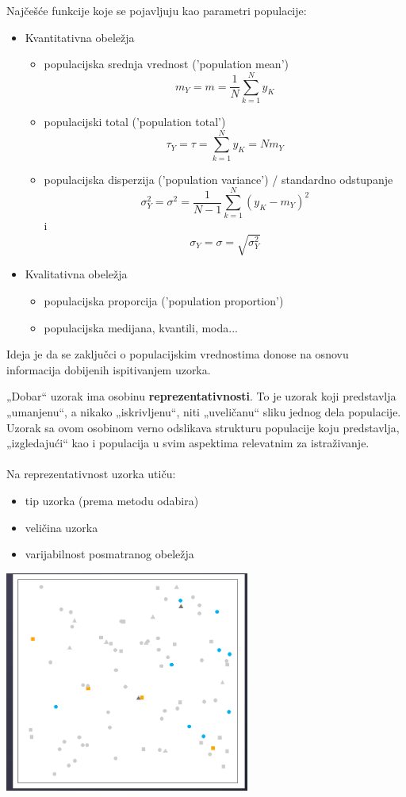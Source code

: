 \documentclass[10pt,a4paper,]{article}
\begin{document}
Najčešće funkcije koje se pojavljuju kao parametri populacije:
\begin{itemize}
	\item Kvantitativna obeležja
		\begin{itemize}
			\item populacijska srednja vrednost ('population mean')
			$$m_Y  = m = \frac{1}{N}\sum_{k=1}^{N}y_{K}$$
			\item populacijski total ('population total')
			$$\tau_{Y} = \tau = \sum_{k=1}^{N}y_{K} = Nm_Y $$
			\item populacijska disperzija ('population variance')
			/ standardno odstupanje
			$$\sigma^2_Y = \sigma^2 = 
			\frac{1}{N-1}\sum_{k=1}^{N}(y_K - m_Y)^2$$ i
			$$\sigma_Y = \sigma = \sqrt{\sigma^2_Y}$$
		\end{itemize}
	\item Kvalitativna obeležja
		\begin{itemize}
			\item populacijska proporcija ('population proportion')
			\item populacijska medijana, kvantili, moda...
		\end{itemize}
\end{itemize}

Ideja je da se zaključci o populacijskim vrednostima donose na osnovu 
informacija dobijenih ispitivanjem uzorka.

„Dobar“ uzorak ima osobinu \textbf{reprezentativnosti}. To je uzorak 
koji predstavlja „umanjenu“, a nikako „iskrivljenu“, niti „uveličanu“ 
sliku jednog dela populacije. Uzorak sa ovom osobinom verno odslikava 
strukturu populacije koju predstavlja, „izgledajući“ kao i populacija 
u svim aspektima relevatnim za istraživanje.
\\
\pagebreak
\\
Na reprezentativnost uzorka utiču:
\begin{itemize}
	\item tip uzorka (prema metodu odabira)
	\item veličina uzorka
	\item varijabilnost posmatranog obeležja
\end{itemize}

\includegraphics[scale=0.5]{primer4}
\end{document}

